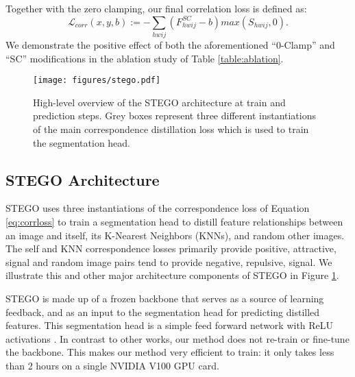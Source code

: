 \documentclass{article} \usepackage{iclr2022_conference,times}
\begin{document}
Together with the zero clamping, our final correlation loss is defined as:
\begin{equation}
    \mathcal{L}_{corr}(x,y,b) := - \sum_{hwij} (F^{SC}_{hwij} - b) max(S_{hwij},0).
    \label{eq:corrloss}
\end{equation}
We demonstrate the positive effect of both the aforementioned ``0-Clamp'' and ``SC'' modifications in the ablation study of Table \ref{table:ablation}.

\begin{figure}[t]
 \centering
 \texttt{[image: figures/stego.pdf]}
  \vspace{-.2in}
  \caption{High-level overview of the STEGO architecture at train and prediction steps. Grey boxes represent three different instantiations of the main correspondence distillation loss which is used to train the segmentation head. }
\label{fig:arch}
\end{figure} 
\subsection{STEGO Architecture}
\label{sec:architecture}



STEGO uses three instantiations of the correspondence loss of Equation \ref{eq:corrloss} to train a segmentation head to distill feature relationships between an image and itself, its K-Nearest Neighbors (KNNs), and random other images. The self and KNN correspondence losses primarily provide positive, attractive, signal and random image pairs tend to provide negative, repulsive, signal. We illustrate this and other major architecture components of STEGO in Figure \ref{fig:arch}. 

STEGO is made up of a frozen backbone that serves as a source of learning feedback, and as an input to the segmentation head for predicting distilled features. This segmentation head is a simple feed forward network with ReLU activations \citep{relu}. In contrast to other works, our method does not re-train or fine-tune the backbone. This makes our method very efficient to train: it only takes less than 2 hours on a single NVIDIA V100 GPU card. 
\end{document}

